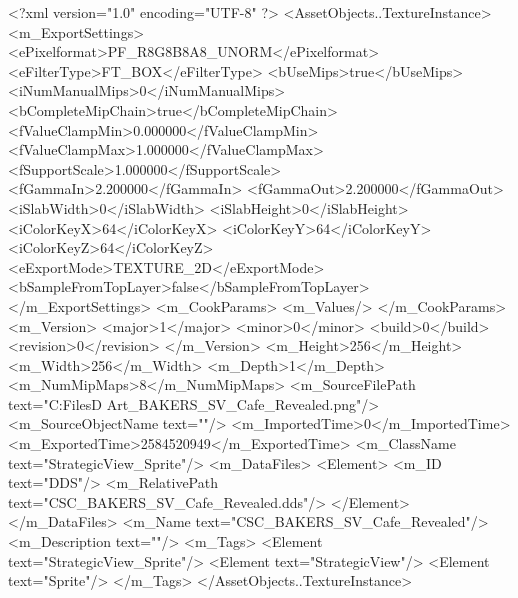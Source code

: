 <?xml version="1.0" encoding="UTF-8" ?>
<AssetObjects..TextureInstance>
	<m_ExportSettings>
		<ePixelformat>PF_R8G8B8A8_UNORM</ePixelformat>
		<eFilterType>FT_BOX</eFilterType>
		<bUseMips>true</bUseMips>
		<iNumManualMips>0</iNumManualMips>
		<bCompleteMipChain>true</bCompleteMipChain>
		<fValueClampMin>0.000000</fValueClampMin>
		<fValueClampMax>1.000000</fValueClampMax>
		<fSupportScale>1.000000</fSupportScale>
		<fGammaIn>2.200000</fGammaIn>
		<fGammaOut>2.200000</fGammaOut>
		<iSlabWidth>0</iSlabWidth>
		<iSlabHeight>0</iSlabHeight>
		<iColorKeyX>64</iColorKeyX>
		<iColorKeyY>64</iColorKeyY>
		<iColorKeyZ>64</iColorKeyZ>
		<eExportMode>TEXTURE_2D</eExportMode>
		<bSampleFromTopLayer>false</bSampleFromTopLayer>
	</m_ExportSettings>
	<m_CookParams>
		<m_Values/>
	</m_CookParams>
	<m_Version>
		<major>1</major>
		<minor>0</minor>
		<build>0</build>
		<revision>0</revision>
	</m_Version>
	<m_Height>256</m_Height>
	<m_Width>256</m_Width>
	<m_Depth>1</m_Depth>
	<m_NumMipMaps>8</m_NumMipMaps>
	<m_SourceFilePath text="C:\Users\Shadow\Desktop\Working Files\2D Art\Quarters\Bakers\StrategicView\CSC_BAKERS_SV_Cafe_Revealed.png"/>
	<m_SourceObjectName text=""/>
	<m_ImportedTime>0</m_ImportedTime>
	<m_ExportedTime>2584520949</m_ExportedTime>
	<m_ClassName text="StrategicView_Sprite"/>
	<m_DataFiles>
		<Element>
			<m_ID text="DDS"/>
			<m_RelativePath text="CSC_BAKERS_SV_Cafe_Revealed.dds"/>
		</Element>
	</m_DataFiles>
	<m_Name text="CSC_BAKERS_SV_Cafe_Revealed"/>
	<m_Description text=""/>
	<m_Tags>
		<Element text="StrategicView_Sprite"/>
		<Element text="StrategicView"/>
		<Element text="Sprite"/>
	</m_Tags>
</AssetObjects..TextureInstance>

